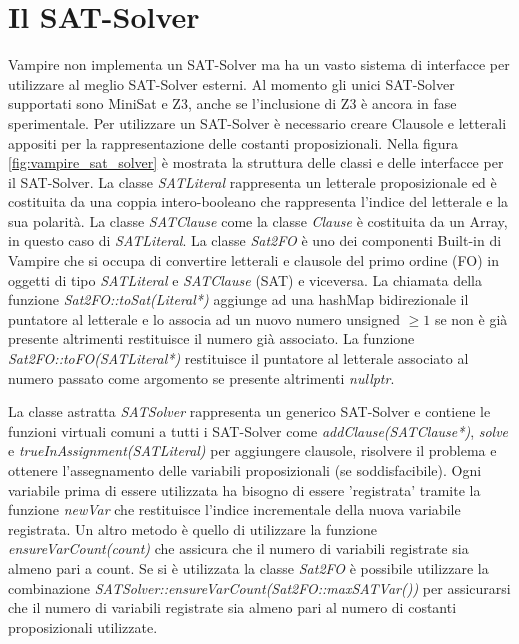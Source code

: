 \documentclass[./main.tex]{subfiles}
\begin{document}
\section{Il SAT-Solver} \label{sec:vampire_sat}
Vampire non implementa un SAT-Solver ma ha un vasto sistema di interfacce per utilizzare al meglio SAT-Solver esterni.
Al momento gli unici SAT-Solver supportati sono MiniSat e Z3, anche se l'inclusione di Z3 è ancora in fase sperimentale.
Per utilizzare un SAT-Solver è necessario creare Clausole e letterali appositi per la rappresentazione delle costanti proposizionali.
Nella figura \ref{fig:vampire_sat_solver} è mostrata la struttura delle classi e delle interfacce per il SAT-Solver.
La classe \textit{SATLiteral} rappresenta un letterale proposizionale ed è costituita da una coppia intero-booleano che rappresenta
l'indice del letterale e la sua polarità. 
La classe \textit{SATClause} come la classe \textit{Clause} è costituita da un Array, in questo caso di \textit{SATLiteral}.
La classe \textit{Sat2FO} è uno dei componenti Built-in di Vampire che si occupa di convertire letterali e clausole 
del primo ordine (FO) in oggetti di tipo \textit{SATLiteral} e \textit{SATClause} (SAT) e viceversa. 
La chiamata della funzione \textit{Sat2FO::toSat(Literal*)} aggiunge ad una hashMap bidirezionale il puntatore al letterale
e lo associa ad un nuovo numero unsigned $\geq 1$ se non è già presente altrimenti restituisce il numero già associato.
La funzione \textit{Sat2FO::toFO(SATLiteral*)} restituisce il puntatore al letterale associato al numero passato come argomento
se presente altrimenti \textit{nullptr}.

La classe astratta \textit{SATSolver} rappresenta un generico SAT-Solver e contiene le funzioni virtuali comuni a tutti i SAT-Solver 
come \textit{addClause(SATClause*)}, \textit{solve} e \textit{trueInAssignment(SATLiteral)} per 
aggiungere clausole, risolvere il problema e ottenere l'assegnamento delle variabili proposizionali (se soddisfacibile). 
Ogni variabile prima di essere utilizzata ha bisogno di essere 'registrata' tramite la funzione \textit{newVar} che restituisce
l'indice incrementale della nuova variabile registrata. Un altro metodo è quello di utilizzare la funzione \textit{ensureVarCount(count)} che 
assicura che il numero di variabili registrate sia almeno pari a count.
Se si è utilizzata la classe \textit{Sat2FO} è possibile utilizzare la combinazione \textit{SATSolver::ensureVarCount(Sat2FO::maxSATVar())}
per assicurarsi che il numero di variabili registrate sia almeno pari al numero di costanti proposizionali utilizzate.
\end{document}
